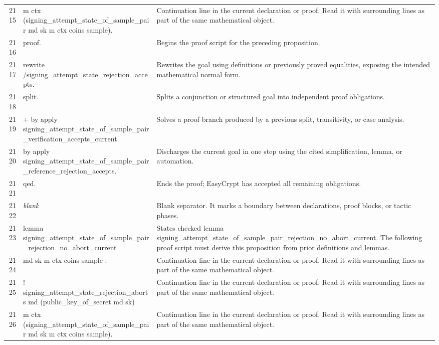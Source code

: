 \documentclass[10pt]{article}
\begin{document}
\begin{longtable}{r L{0.53\textwidth} L{0.37\textwidth}}
2115 & {\ttfamily\scriptsize     m ctx (signing\_attempt\_state\_of\_sample\_pair md sk m ctx coins sample).} & Continuation line in the current declaration or proof.  Read it with surrounding lines as part of the same mathematical object. \\
2116 & {\ttfamily\scriptsize proof.} & Begins the proof script for the preceding proposition. \\
2117 & {\ttfamily\scriptsize rewrite /signing\_attempt\_state\_rejection\_accepts.} & Rewrites the goal using definitions or previously proved equalities, exposing the intended mathematical normal form. \\
2118 & {\ttfamily\scriptsize split.} & Splits a conjunction or structured goal into independent proof obligations. \\
2119 & {\ttfamily\scriptsize + by apply signing\_attempt\_state\_of\_sample\_pair\_verification\_accepts\_current.} & Solves a proof branch produced by a previous split, transitivity, or case analysis. \\
2120 & {\ttfamily\scriptsize by apply signing\_attempt\_state\_of\_sample\_pair\_reference\_rejection\_accepts.} & Discharges the current goal in one step using the cited simplification, lemma, or automation. \\
2121 & {\ttfamily\scriptsize qed.} & Ends the proof; EasyCrypt has accepted all remaining obligations. \\
2122 & {\ttfamily\scriptsize \emph{blank}} & Blank separator.  It marks a boundary between declarations, proof blocks, or tactic phases. \\
2123 & {\ttfamily\scriptsize lemma signing\_attempt\_state\_of\_sample\_pair\_rejection\_no\_abort\_current} & States checked lemma signing\_attempt\_state\_of\_sample\_pair\_rejection\_no\_abort\_current.  The following proof script must derive this proposition from prior definitions and lemmas. \\
2124 & {\ttfamily\scriptsize    md sk m ctx coins sample :} & Continuation line in the current declaration or proof.  Read it with surrounding lines as part of the same mathematical object. \\
2125 & {\ttfamily\scriptsize   ! signing\_attempt\_state\_rejection\_aborts md (public\_key\_of\_secret md sk)} & Continuation line in the current declaration or proof.  Read it with surrounding lines as part of the same mathematical object. \\
2126 & {\ttfamily\scriptsize       m ctx (signing\_attempt\_state\_of\_sample\_pair md sk m ctx coins sample).} & Continuation line in the current declaration or proof.  Read it with surrounding lines as part of the same mathematical object. \\

\end{longtable}
\end{document}
